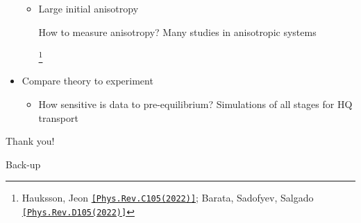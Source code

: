 \documentclass[aspectratio=169,11pt,usenames,dvipsnames]{beamer}
\renewcommand{\thefootnote}{$\star$}
\newcommand{\symfootnote}[1]{%
\let\oldthefootnote=\thefootnote%
\stepcounter{mpfootnote}%
\addtocounter{footnote}{-1}%
\renewcommand{\thefootnote}{$\dagger$}%
\footnote{#1}%
\let\thefootnote=\oldthefootnote%
}
\begin{document}
\begin{frame}
\begin{itemize}
\begin{itemize}
                    \item[\raisebox{0.2em}{\scalebox{0.6}{${\color{pinky}\blacktriangleright}$}}] Large initial anisotropy \\
                    {\scriptsize\color{lightgray}How to measure anisotropy? Many studies in anisotropic systems\symfootnote{\scriptsize Hauksson, Jeon \href{https://doi.org/10.1103/PhysRevC.105.014914}{{\color{customblue}\texttt{[Phys.Rev.C105(2022)]}}}; Barata, Sadofyev, Salgado \href{https://doi.org/10.1103/PhysRevD.105.114010}{{\color{customblue}\texttt{[Phys.Rev.D105(2022)]}}}}}
                \end{itemize}
                \item  {\large{Compare theory to experiment}}
                \begin{itemize}
                    \item[\raisebox{0.2em}{\scalebox{0.6}{${\color{jyured}\blacktriangleright}$}}] {\scriptsize\color{lightgray} How sensitive is data to pre-equilibrium? Simulations of all stages for HQ transport
                    }
                \end{itemize}
        \end{itemize} 
\end{frame}

\begin{frame}{}
    \vspace{20pt}
    \huge\centering Thank you!
\end{frame}

\appendix

\begin{frame}{}
    \vspace{20pt}
    \huge\centering Back-up
\end{frame}
\end{document}
